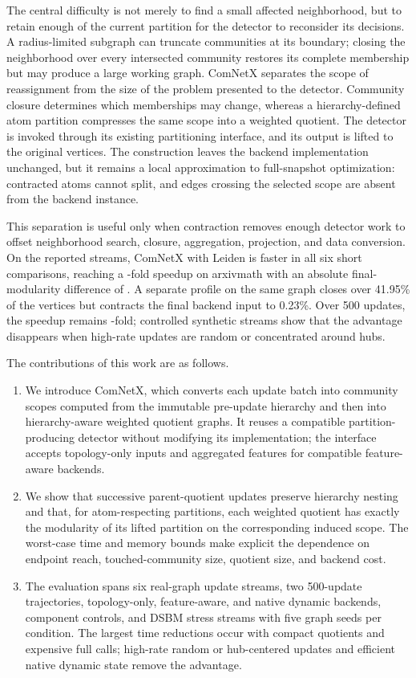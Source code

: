 \documentclass{ieeeaccess}
\begin{document}
The central difficulty is not merely to find a small affected neighborhood,
but to retain enough of the current partition for the detector to reconsider
its decisions. A radius-limited subgraph can truncate communities at its
boundary; closing the neighborhood over every intersected community restores
its complete membership but may produce a large working graph. ComNetX separates the
scope of reassignment from the size of the problem presented to the detector.
Community closure determines which memberships may change, whereas a
hierarchy-defined atom partition compresses the same scope into a weighted
quotient. The detector is invoked through its existing partitioning interface,
and its output is lifted to the original vertices. The construction leaves the
backend implementation unchanged, but it remains a local approximation to
full-snapshot optimization: contracted atoms cannot split, and edges crossing
the selected scope are absent from the backend instance.

This separation is useful only when contraction removes enough detector work
to offset neighborhood search, closure, aggregation, projection, and data
conversion. On the reported streams, ComNetX with Leiden is faster in all six
short comparisons, reaching a \ArxivShortSpeedup-fold speedup on arxivmath
with an absolute final-modularity difference of \ArxivShortQGap. A separate
profile on the same graph closes over 41.95\% of the vertices but contracts the
final backend input to 0.23\%. Over 500 updates, the speedup remains
\ArxivLongSpeedup-fold; controlled synthetic streams show that the advantage
disappears when high-rate updates are random or concentrated around hubs.

The contributions of this work are as follows.

\begin{enumerate}
\item We introduce ComNetX, which converts each update batch into community
scopes computed from the immutable pre-update hierarchy and then into
hierarchy-aware weighted quotient graphs. It
reuses a compatible partition-producing detector without modifying its
implementation; the interface accepts topology-only inputs and aggregated
features for compatible feature-aware backends.
\item We show that successive parent-quotient updates preserve hierarchy
nesting and that, for atom-respecting partitions, each weighted quotient has
exactly the modularity of its lifted partition on the corresponding induced
scope. The worst-case time and memory bounds make explicit the dependence on
endpoint reach, touched-community size, quotient size, and backend cost.
\item The evaluation spans six real-graph update streams, two 500-update
trajectories, topology-only, feature-aware, and native dynamic backends,
component controls, and DSBM stress streams with five graph seeds per condition.
The largest time reductions occur with compact quotients and expensive full
calls; high-rate random or hub-centered updates and efficient native dynamic
state remove the advantage.
\end{enumerate}
\end{document}
